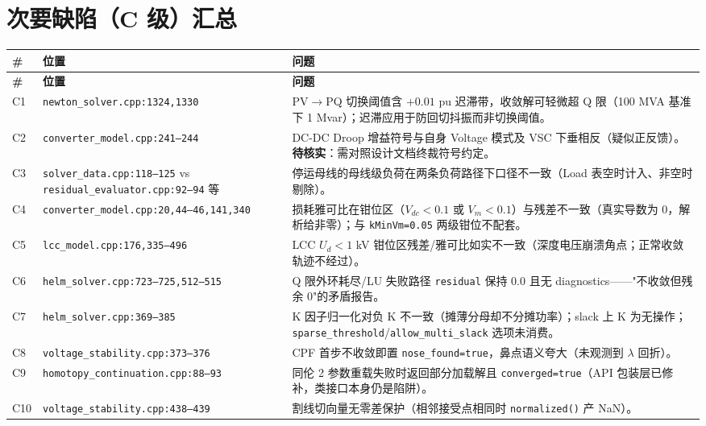\documentclass[11pt,a4paper,fontset=fandol]{ctexart}
\newcommand{\file}[1]{\texttt{#1}}
\begin{document}
\newpage
\section{次要缺陷（C 级）汇总}
\label{sec:minor}

\begin{footnotesize}
\begin{longtable}{@{}p{0.4cm}p{5.2cm}p{9.6cm}@{}}
\toprule
\textbf{\#} & \textbf{位置} & \textbf{问题}\\
\midrule
\endfirsthead
\toprule
\textbf{\#} & \textbf{位置} & \textbf{问题}\\
\midrule
\endhead
C1 & \file{newton\_solver.cpp:1324,1330} & PV$\to$PQ 切换阈值含 $+0.01$ pu 迟滞带，收敛解可轻微超 Q 限（100 MVA 基准下 1 Mvar）；迟滞应用于防回切抖振而非切换阈值。\\
C2 & \file{converter\_model.cpp:241--244} & DC-DC Droop 增益符号与自身 Voltage 模式及 VSC 下垂相反（疑似正反馈）。\textbf{待核实}：需对照设计文档终裁符号约定。\\
C3 & \file{solver\_data.cpp:118--125} vs \file{residual\_evaluator.cpp:92--94} 等 & 停运母线的母线级负荷在两条负荷路径下口径不一致（Load 表空时计入、非空时剔除）。\\
C4 & \file{converter\_model.cpp:20,}\newline\file{44--46,141,340} & 损耗雅可比在钳位区（$V_{dc}<0.1$ 或 $V_m<0.1$）与残差不一致（真实导数为 0，解析给非零）；与 \texttt{kMinVm=0.05} 两级钳位不配套。\\
C5 & \file{lcc\_model.cpp:176,335--496} & LCC $U_d<1$ kV 钳位区残差/雅可比如实不一致（深度电压崩溃角点；正常收敛轨迹不经过）。\\
C6 & \file{helm\_solver.cpp:723--725,512--515} & Q 限外环耗尽/LU 失败路径 \texttt{residual} 保持 0.0 且无 diagnostics——"不收敛但残余 0"的矛盾报告。\\
C7 & \file{helm\_solver.cpp:369--385} & K 因子归一化对负 K 不一致（摊薄分母却不分摊功率）；slack 上 K 为无操作；\texttt{sparse\_threshold}/\texttt{allow\_multi\_slack} 选项未消费。\\
C8 & \file{voltage\_stability.cpp:373--376} & CPF 首步不收敛即置 \texttt{nose\_found=true}，鼻点语义夸大（未观测到 $\lambda$ 回折）。\\
C9 & \file{homotopy\_continuation.cpp:88--93} & 同伦 2 参数重载失败时返回部分加载解且 \texttt{converged=true}（API 包装层已修补，类接口本身仍是陷阱）。\\
C10 & \file{voltage\_stability.cpp:438--439} & 割线切向量无零差保护（相邻接受点相同时 \texttt{normalized()} 产 NaN）。\\

\end{longtable}
\end{footnotesize}
\end{document}
